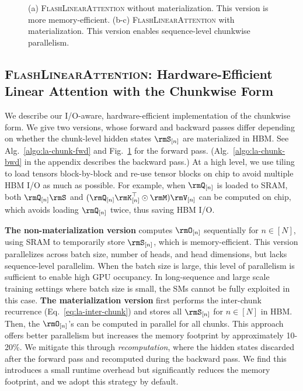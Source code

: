 \begin{figure}[t]
{\begin{tikzpicture}[%
            every path/.style={thick,%
            },
                           dcs/.style = {double copy shadow, shadow xshift=4pt, shadow yshift=-4pt}
          ]
        \end{tikzpicture}   
}
        \vspace{-2mm}
        \caption{(a) \textsc{FlashLinearAttention} without materialization. This version is more memory-efficient. (b-c) \textsc{FlashLinearAttention} with materialization. This version enables sequence-level chunkwise parallelism.} \label{fig:chunk}
              
    \end{figure}
\vspace{-2mm}
\subsection{\textnormal{\textsc{FlashLinearAttention}}: Hardware-Efficient  Linear Attention with the Chunkwise Form}
\label{sec:fla}
\vspace{-2mm}
We describe our I/O-aware, hardware-efficient implementation of the chunkwise form. We give two versions, whose forward and backward passes differ depending on whether the chunk-level hidden states  $\rmS_{[n]}$ are materialized in HBM. See Alg.~\ref{algo:la-chunk-fwd} and Fig.~\ref{fig:chunk} for the forward pass. (Alg.~\ref{algo:la-chunk-bwd} in the appendix describes the backward pass.)  At a high level, we use tiling to load tensors block-by-block and re-use tensor blocks on chip to avoid multiple HBM I/O as {much} as possible. For example, when $\rmQ_{[n]}$ is loaded to SRAM, both $\rmQ_{[n]}\rmS$ and $(\rmQ_{[n]}\rmK_{[n]}^{\top}\odot\rmM)\rmV_{[n]}$ can be computed on chip, which avoids loading $\rmQ_{[n]}$ twice, thus saving HBM I/O. 

\textbf{The non-materialization version} computes $\rmO_{[n]}$ sequentially for $n \in [N]$, using SRAM to temporarily store $\rmS_{[n]}$, which is memory-efficient. This version parallelizes across batch size, number of heads, and head dimensions, but lacks sequence-level parallelim. When the batch size is large, this level of parallelism is sufficient to enable high GPU occupancy. In long-sequence and large scale training settings where batch size is small, the SMs cannot be fully exploited in this case. \textbf{The materialization version} first performs the inter-chunk recurrence (Eq.~\ref{eq:la-inter-chunk}) and stores all $\rmS_{[n]}$ for $n \in [N]$ in HBM. Then, the $\rmO_{[n]}$'s can be computed in parallel for all chunks.  
 This approach offers better parallelism but increases the memory footprint by approximately 10-20\%. We mitigate this through \textit{recomputation}, where the hidden states discarded  after the forward pass and recomputed during the backward pass. We find this introduces a small runtime  overhead but significantly reduces the memory footprint, and  we adopt this strategy by default.

